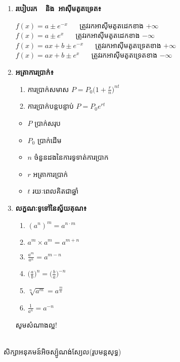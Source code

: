 \documentclass[12pt, a5paper]{article}
\begin{document}
\begin{enumerate}[m]
\begin{multicols}{3}
	\end{multicols}
	\item \textbf{\sffamily របៀបរក~~និង~អាស៊ីមតូតទ្រេត៖}
	\begin{center}
		$f(x)=a\pm e^{-x}$ ~~ ត្រូវរកអាស៊ីមតូតដេកខាង $+\infty$\\
		$f(x)=a\pm e^{x}$ ~~ ត្រូវរកអាស៊ីមតូតដេកខាង $-\infty$\\
		$f(x)=ax+b\pm e^{-x}$ ~~ ត្រូវរកអាស៊ីមតូតទ្រេតខាង $+\infty$\\
		$f(x)=ax+b\pm e^{x}$ ~~ ត្រូវរកអាស៊ីមតូតទ្រេតខាង $-\infty$
	\end{center}
	\item \textbf{\sffamily  អត្រាការប្រាក់៖}
		\begin{enumerate}[k]
			\item ការប្រាក់សមាស $P=P_0\bigg(1+\frac{r}{n}\bigg)^{nt}$
			\item ការប្រាក់បន្តបន្ទាប់ $P=P_0e^{rt}$
		\end{enumerate}
		\begin{multicols}{2}
			\begin{itemize}
				\item $P$ ប្រាក់សរុប
				\item $P_0$ ប្រាក់ដើម
				\item $n$ ចំនួនដងនៃការទូទាត់ការប្រាក
				\item $r$ អត្រាការប្រាក់ 
				\item $t$ រយៈពេលគិតជាឆ្នាំ
			\end{itemize}
		\end{multicols}
		\item \textbf{\sffamily លក្ខណៈទូទៅនៃស្វ័យគុណ៖}
		\begin{enumerate}[k, 3]
			\item $(a^n)^m=a^{n\cdot m}$
			\item $a^m\times a^m=a^{m+n}$
			\item $\frac{a^m}{a^n}=a^{m-n}$
			\item $\bigg(\frac{a}{b}\bigg)^n=\bigg(\frac{b}{a}\bigg)^{-n}$
			\item $\sqrt[n]{a^m}=a^{\frac{m}{n}}$
			\item $\frac{1}{a^n}=a^{-n}$
		\end{enumerate}
	\begin{center}
		\sffamily\color{black}
		សូមសំណាងល្អ!
	\end{center}
\end{enumerate}
\newpage
\begin{center}
	\sffamily\color{black}
	\\
	សិក្សាអនុគមន៍អិចស្ប៉ូណង់ស្យែល(រូបមន្តសុទ្ធ)
\end{center}
\end{document}
